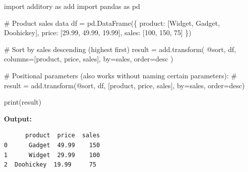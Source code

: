 \documentclass[
  letterpaper,
]{scrbook}
\newenvironment{Shaded}{\begin{snugshade}}{\end{snugshade}}
\newcommand{\BuiltInTok}[1]{\textcolor[rgb]{0.00,0.23,0.31}{#1}}
\newcommand{\CommentTok}[1]{\textcolor[rgb]{0.37,0.37,0.37}{#1}}
\newcommand{\DecValTok}[1]{\textcolor[rgb]{0.68,0.00,0.00}{#1}}
\newcommand{\FloatTok}[1]{\textcolor[rgb]{0.68,0.00,0.00}{#1}}
\newcommand{\ImportTok}[1]{\textcolor[rgb]{0.00,0.46,0.62}{#1}}
\newcommand{\NormalTok}[1]{\textcolor[rgb]{0.00,0.23,0.31}{#1}}
\newcommand{\OperatorTok}[1]{\textcolor[rgb]{0.37,0.37,0.37}{#1}}
\newcommand{\StringTok}[1]{\textcolor[rgb]{0.13,0.47,0.30}{#1}}
\begin{document}
\begin{Shaded}
\begin{Highlighting}[]
\ImportTok{import}\NormalTok{ additory }\ImportTok{as}\NormalTok{ add}
\ImportTok{import}\NormalTok{ pandas }\ImportTok{as}\NormalTok{ pd}

\CommentTok{\# Product sales data}
\NormalTok{df }\OperatorTok{=}\NormalTok{ pd.DataFrame(\{}
    \StringTok{\textquotesingle{}product\textquotesingle{}}\NormalTok{: [}\StringTok{\textquotesingle{}Widget\textquotesingle{}}\NormalTok{, }\StringTok{\textquotesingle{}Gadget\textquotesingle{}}\NormalTok{, }\StringTok{\textquotesingle{}Doohickey\textquotesingle{}}\NormalTok{],}
    \StringTok{\textquotesingle{}price\textquotesingle{}}\NormalTok{: [}\FloatTok{29.99}\NormalTok{, }\FloatTok{49.99}\NormalTok{, }\FloatTok{19.99}\NormalTok{],}
    \StringTok{\textquotesingle{}sales\textquotesingle{}}\NormalTok{: [}\DecValTok{100}\NormalTok{, }\DecValTok{150}\NormalTok{, }\DecValTok{75}\NormalTok{]}
\NormalTok{\})}

\CommentTok{\# Sort by sales descending (highest first)}
\NormalTok{result }\OperatorTok{=}\NormalTok{ add.transform(}
    \StringTok{\textquotesingle{}@sort\textquotesingle{}}\NormalTok{,}
\NormalTok{    df,}
\NormalTok{    columns}\OperatorTok{=}\NormalTok{[}\StringTok{\textquotesingle{}product\textquotesingle{}}\NormalTok{, }\StringTok{\textquotesingle{}price\textquotesingle{}}\NormalTok{, }\StringTok{\textquotesingle{}sales\textquotesingle{}}\NormalTok{],}
\NormalTok{    by}\OperatorTok{=}\StringTok{\textquotesingle{}sales\textquotesingle{}}\NormalTok{,}
\NormalTok{    order}\OperatorTok{=}\StringTok{\textquotesingle{}desc\textquotesingle{}}
\NormalTok{)}

\CommentTok{\# Positional parameters (also works without naming certain parameters):}
\CommentTok{\# result = add.transform(\textquotesingle{}@sort\textquotesingle{}, df, [\textquotesingle{}product\textquotesingle{}, \textquotesingle{}price\textquotesingle{}, \textquotesingle{}sales\textquotesingle{}], by=\textquotesingle{}sales\textquotesingle{}, order=\textquotesingle{}desc\textquotesingle{})}

\BuiltInTok{print}\NormalTok{(result)}
\end{Highlighting}
\end{Shaded}

\textbf{Output:}

\begin{verbatim}
      product  price  sales
0      Gadget  49.99    150
1      Widget  29.99    100
2  Doohickey  19.99     75
\end{verbatim}
\end{document}
